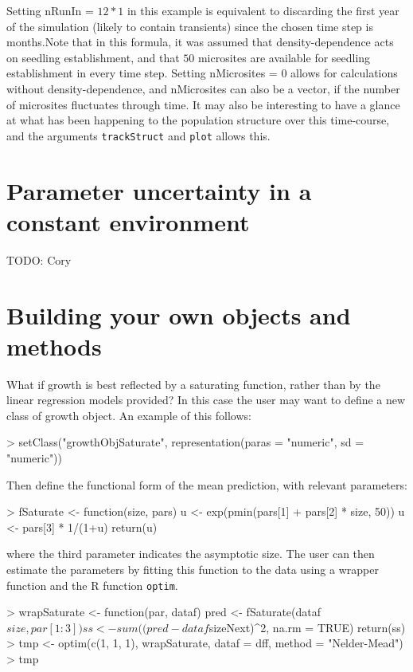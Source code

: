 \documentclass{article}
\begin{document}
Setting nRunIn = $12*1$ in this example is equivalent to discarding the first 
year of the simulation (likely to contain transients) since the chosen time step
is months.Note that in this formula, it was assumed that density-dependence acts on
seedling establishment, and that $50$ microsites are available for seedling
establishment in every time step. Setting nMicrosites = $0$ allows for
calculations without density-dependence, and nMicrosites can also be a vector,
if the number of microsites fluctuates through time. It may also be interesting
to have a glance at what has been happening to the population structure over
this time-course, and the arguments {\tt trackStruct} and {\tt plot} allows this.


\section{Parameter uncertainty in a constant environment}

TODO: Cory


\section{Building your own objects and methods}
What if growth is best reflected by a saturating function, rather than by the
linear regression models provided?  In this case the user may want to define a
new class of growth object.  An example of this follows:
\begin{Schunk}
\begin{Sinput}
> setClass("growthObjSaturate", representation(paras = "numeric", sd = "numeric"))
\end{Sinput}
\end{Schunk}
Then define the functional form of the mean prediction, with relevant parameters: 
\begin{Schunk}
\begin{Sinput}
> fSaturate <- function(size, pars) { 
      u <- exp(pmin(pars[1] + pars[2] * size, 50))
      u <- pars[3] * 1/(1+u)
      return(u)
  }
\end{Sinput}
\end{Schunk}
where the third parameter indicates the asymptotic size. The user can then
estimate the parameters by fitting this function to the data using a wrapper
function and the R function {\tt optim}.
\begin{Schunk}
\begin{Sinput}
> wrapSaturate <- function(par, dataf) { 
      pred <- fSaturate(dataf$size, par[1:3])
      ss <- sum((pred - dataf$sizeNext)^2, na.rm = TRUE)
      return(ss)
      }
> tmp <- optim(c(1, 1, 1), wrapSaturate, dataf = dff, method = "Nelder-Mead")
> tmp    
\end{Sinput}
\end{Schunk}
\end{document}
